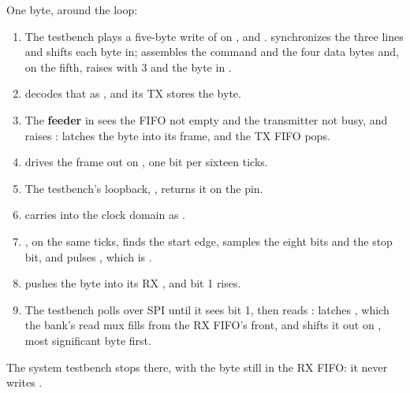  One byte, around the loop:
\begin{enumerate}
  \item The testbench plays a five-byte write of  on ,  and
    .  synchronizes the three lines and shifts each byte in;
     assembles the command and the four data bytes and, on the fifth, raises
     with  3 and the byte in .
  \item {} decodes that as , and its TX  stores the byte.
  \item The \textbf{feeder} in  sees the FIFO not empty and the transmitter not busy,
    and raises :  latches the byte into its frame, and the TX FIFO pops.
  \item {} drives the frame out on , one bit per sixteen 
    ticks.
  \item The testbench's loopback, , returns it on the  pin.
  \item {} carries  into the clock domain as .
  \item {}, on the same ticks, finds the start edge, samples the eight bits and the stop
    bit, and pulses , which is .
  \item {} pushes the byte into its RX , and  bit 1 rises.
  \item The testbench polls  over SPI until it sees bit 1, then reads :
     latches , which the bank's read mux fills from the RX
    FIFO's front, and  shifts it out on , most significant byte first.
\end{enumerate}
The system testbench stops there, with the byte still in the RX FIFO: it never writes .
